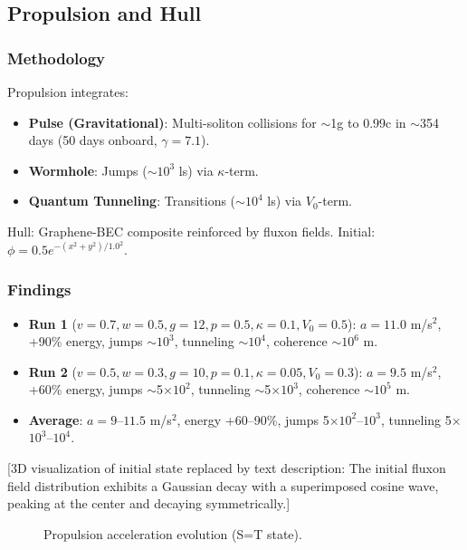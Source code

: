 \documentclass[11pt]{article}
\begin{document}
\subsection{Propulsion and Hull}
\subsubsection{Methodology}
Propulsion integrates:
\begin{itemize}
    \item \textbf{Pulse (Gravitational)}: Multi-soliton collisions for $\sim$1g to 0.99c in $\sim$354 days (50 days onboard, $\gamma = 7.1$).
    \item \textbf{Wormhole}: Jumps ($\sim$$10^3$ ls) via $\kappa$-term.
    \item \textbf{Quantum Tunneling}: Transitions ($\sim$$10^4$ ls) via $V_0$-term.
\end{itemize}
Hull: Graphene-BEC composite reinforced by fluxon fields. Initial: $\phi = 0.5 e^{-(x^2 + y^2)/1.0^2}$.

\subsubsection{Findings}
\begin{itemize}
    \item \textbf{Run 1} ($v=0.7, w=0.5, g=12, p=0.5, \kappa=0.1, V_0=0.5$): $a = 11.0$ m/s$^2$, +90\% energy, jumps $\sim$$10^3$, tunneling $\sim$$10^4$, coherence $\sim$$10^6$ m.
    \item \textbf{Run 2} ($v=0.5, w=0.3, g=10, p=0.1, \kappa=0.05, V_0=0.3$): $a = 9.5$ m/s$^2$, +60\% energy, jumps $\sim$5$\times$$10^2$, tunneling $\sim$5$\times$$10^3$, coherence $\sim$$10^5$ m.
    \item \textbf{Average}: $a = 9$--$11.5$ m/s$^2$, energy +60--90\%, jumps 5$\times$$10^2$--$10^3$, tunneling 5$\times$$10^3$--$10^4$.
\end{itemize}
[3D visualization of initial state replaced by text description: The initial fluxon field distribution exhibits a Gaussian decay with a superimposed cosine wave, peaking at the center and decaying symmetrically.]

\begin{figure}[ht]
    \centering
    \caption{Propulsion acceleration evolution (S=T state).}
    \label{fig:prop_acc}
\end{figure}
\end{document}
